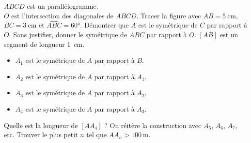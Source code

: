 \documentclass["../Cours.tex"]{subfiles}
\begin{document}
\clearpage
\EXERCICES
\begin{questions}
    \exercice $ABCD$ est un parallélogramme.\\
    $O$ est l'intersection des diagonales de $ABCD$.
        \question Tracer la figure avec $AB=\qty{5}{\centi\metre}$, $BC=\qty{3}{\centi\metre}$ et $\widehat{ABC}=\ang{60}$.
        \question Démontrer que $A$ est le symétrique de $C$ par rapport à $O$.
        \question Sans justifier, donner le symétrique de $ABC$ par rapport à $O$.
    \exercice $[AB]$ est un segment de longueur \qty{1}{\centi\metre}.
    \begin{itemize}
        \item $A_1$ est le symétrique de $A$ par rapport à $B$.
        \item $A_2$ est le symétrique de $A$ par rapport à $A_1$.
        \item $A_3$ est le symétrique de $A$ par rapport à $A_2$.
        \item $A_4$ est le symétrique de $A$ par rapport à $A_3$.
    \end{itemize}
        \question Quelle est la longueur de $[AA_4]$ ?
        \question On réitère la construction avec $A_5$, $A_6$, $A_7$, etc. Trouver le plus petit $n$ tel que $AA_n > \qty{100}{\metre}$.
\end{questions}
\end{document}
